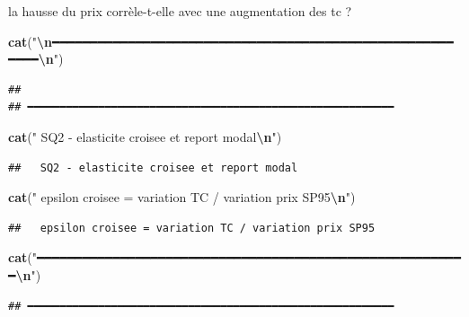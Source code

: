 \documentclass[
]{article}
\newenvironment{Shaded}{\begin{snugshade}}{\end{snugshade}}
\newcommand{\FunctionTok}[1]{\textcolor[rgb]{0.13,0.29,0.53}{\textbf{#1}}}
\newcommand{\NormalTok}[1]{#1}
\newcommand{\SpecialCharTok}[1]{\textcolor[rgb]{0.81,0.36,0.00}{\textbf{#1}}}
\newcommand{\StringTok}[1]{\textcolor[rgb]{0.31,0.60,0.02}{#1}}
\begin{document}
la hausse du prix corrèle-t-elle avec une augmentation des tc ?

\begin{Shaded}
\begin{Highlighting}[]
\FunctionTok{cat}\NormalTok{(}\StringTok{"}\SpecialCharTok{\textbackslash{}n}\StringTok{━━━━━━━━━━━━━━━━━━━━━━━━━━━━━━━━━━━━━━━━━━━━━━━━━━━━━━━━━}\SpecialCharTok{\textbackslash{}n}\StringTok{"}\NormalTok{)}
\end{Highlighting}
\end{Shaded}

\begin{verbatim}
## 
## ━━━━━━━━━━━━━━━━━━━━━━━━━━━━━━━━━━━━━━━━━━━━━━━━━━━━━━━━━
\end{verbatim}

\begin{Shaded}
\begin{Highlighting}[]
\FunctionTok{cat}\NormalTok{(}\StringTok{"  SQ2 {-} elasticite croisee et report modal}\SpecialCharTok{\textbackslash{}n}\StringTok{"}\NormalTok{)}
\end{Highlighting}
\end{Shaded}

\begin{verbatim}
##   SQ2 - elasticite croisee et report modal
\end{verbatim}

\begin{Shaded}
\begin{Highlighting}[]
\FunctionTok{cat}\NormalTok{(}\StringTok{"  epsilon croisee = variation TC / variation prix SP95}\SpecialCharTok{\textbackslash{}n}\StringTok{"}\NormalTok{)}
\end{Highlighting}
\end{Shaded}

\begin{verbatim}
##   epsilon croisee = variation TC / variation prix SP95
\end{verbatim}

\begin{Shaded}
\begin{Highlighting}[]
\FunctionTok{cat}\NormalTok{(}\StringTok{"━━━━━━━━━━━━━━━━━━━━━━━━━━━━━━━━━━━━━━━━━━━━━━━━━━━━━━━━━}\SpecialCharTok{\textbackslash{}n}\StringTok{"}\NormalTok{)}
\end{Highlighting}
\end{Shaded}

\begin{verbatim}
## ━━━━━━━━━━━━━━━━━━━━━━━━━━━━━━━━━━━━━━━━━━━━━━━━━━━━━━━━━
\end{verbatim}
\end{document}
